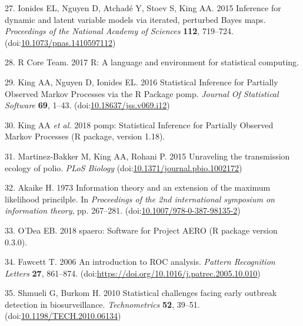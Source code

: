 \documentclass[3p]{elsarticle} %
\begin{document}
\leavevmode\hypertarget{ref-Ionides2015}{}%
27. Ionides EL, Nguyen D, Atchadé Y, Stoev S, King AA. 2015 Inference
for dynamic and latent variable models via iterated, perturbed Bayes
maps. \emph{Proceedings of the National Academy of Sciences}
\textbf{112}, 719--724.
(doi:\href{https://doi.org/10.1073/pnas.1410597112}{10.1073/pnas.1410597112})

\leavevmode\hypertarget{ref-R2017}{}%
28. R Core Team. 2017 R: A language and environment for statistical
computing.

\leavevmode\hypertarget{ref-King2016}{}%
29. King AA, Nguyen D, Ionides EL. 2016 Statistical Inference for
Partially Observed Markov Processes via the R Package pomp.
\emph{Journal Of Statistical Software} \textbf{69}, 1--43.
(doi:\href{https://doi.org/10.18637/jss.v069.i12}{10.18637/jss.v069.i12})

\leavevmode\hypertarget{ref-King2018}{}%
30. King AA \emph{et al.} 2018 pomp: Statistical Inference for Partially
Observed Markov Processes (R package, version 1.18).

\leavevmode\hypertarget{ref-Martinez-Bakker2015}{}%
31. Martinez-Bakker M, King AA, Rohani P. 2015 Unraveling the
transmission ecology of polio. \emph{PLoS Biology}
(doi:\href{https://doi.org/10.1371/journal.pbio.1002172}{10.1371/journal.pbio.1002172})

\leavevmode\hypertarget{ref-Akaike1973}{}%
32. Akaike H. 1973 Information theory and an extension of the maximum
likelihood princilple. In \emph{Proceedings of the 2nd international
symposium on information theory}, pp. 267--281.
(doi:\href{https://doi.org/10.1007/978-0-387-98135-2}{10.1007/978-0-387-98135-2})

\leavevmode\hypertarget{ref-ODea2018}{}%
33. O'Dea EB. 2018 spaero: Software for Project AERO (R package version
0.3.0).

\leavevmode\hypertarget{ref-Fawcett2006}{}%
34. Fawcett T. 2006 An introduction to ROC analysis. \emph{Pattern
Recognition Letters} \textbf{27}, 861--874.
(doi:\href{https://doi.org/https://doi.org/10.1016/j.patrec.2005.10.010}{https://doi.org/10.1016/j.patrec.2005.10.010})

\leavevmode\hypertarget{ref-Shmueli2010}{}%
35. Shmueli G, Burkom H. 2010 Statistical challenges facing early
outbreak detection in biosurveillance. \emph{Technometrics} \textbf{52},
39--51.
(doi:\href{https://doi.org/10.1198/TECH.2010.06134}{10.1198/TECH.2010.06134})
\end{document}
